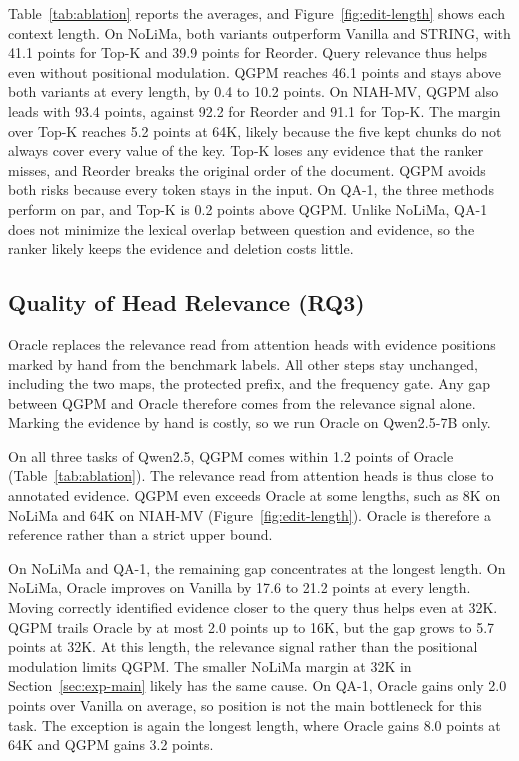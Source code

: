 \documentclass[11pt]{article}
\begin{document}
Table~\ref{tab:ablation} reports the averages, and Figure~\ref{fig:edit-length} shows each context length. On NoLiMa, both variants outperform Vanilla and STRING, with 41.1 points for Top-K and 39.9 points for Reorder. Query relevance thus helps even without positional modulation. QGPM reaches 46.1 points and stays above both variants at every length, by 0.4 to 10.2 points. On NIAH-MV, QGPM also leads with 93.4 points, against 92.2 for Reorder and 91.1 for Top-K. The margin over Top-K reaches 5.2 points at 64K, likely because the five kept chunks do not always cover every value of the key. Top-K loses any evidence that the ranker misses, and Reorder breaks the original order of the document. QGPM avoids both risks because every token stays in the input. On QA-1, the three methods perform on par, and Top-K is 0.2 points above QGPM. Unlike NoLiMa, QA-1 does not minimize the lexical overlap between question and evidence, so the ranker likely keeps the evidence and deletion costs little.


\subsection{Quality of Head Relevance (RQ3)}
\label{sec:exp-oracle}

Oracle replaces the relevance read from attention heads with evidence positions marked by hand from the benchmark labels. All other steps stay unchanged, including the two maps, the protected prefix, and the frequency gate. Any gap between QGPM and Oracle therefore comes from the relevance signal alone. Marking the evidence by hand is costly, so we run Oracle on Qwen2.5-7B only.

On all three tasks of Qwen2.5, QGPM comes within 1.2 points of Oracle (Table~\ref{tab:ablation}). The relevance read from attention heads is thus close to annotated evidence. QGPM even exceeds Oracle at some lengths, such as 8K on NoLiMa and 64K on NIAH-MV (Figure~\ref{fig:edit-length}). Oracle is therefore a reference rather than a strict upper bound.

On NoLiMa and QA-1, the remaining gap concentrates at the longest length. On NoLiMa, Oracle improves on Vanilla by 17.6 to 21.2 points at every length. Moving correctly identified evidence closer to the query thus helps even at 32K. QGPM trails Oracle by at most 2.0 points up to 16K, but the gap grows to 5.7 points at 32K. At this length, the relevance signal rather than the positional modulation limits QGPM. The smaller NoLiMa margin at 32K in Section~\ref{sec:exp-main} likely has the same cause. On QA-1, Oracle gains only 2.0 points over Vanilla on average, so position is not the main bottleneck for this task. The exception is again the longest length, where Oracle gains 8.0 points at 64K and QGPM gains 3.2 points.
\end{document}

